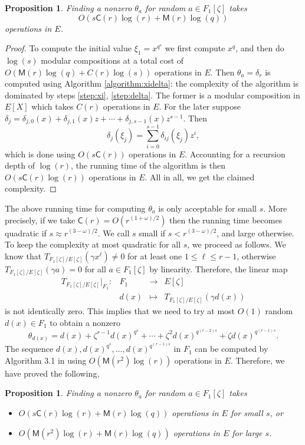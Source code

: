 \documentclass[12pt]{article}
\theoremstyle{plain}
\newtheorem{proposition}[theorem]{Proposition}
\theoremstyle{definition}
\def\MM{\ensuremath{\mathsf{M}}}
\def\CC{\ensuremath{\mathsf{C}}}
\newcounter{algorithm}
\begin{document}
\begin{proposition}
	\label{proposition:XiDelta}
	Finding a nonzero $\theta_a$ for random $a \in F_1[\zeta]$ takes \[O(s\CC(r)\log(r) + 
	\MM(r)\log(q))\] operations in $E$.
\end{proposition}
\begin{proof}
	To compute the initial value $\xi_1 = x^{q^s}$ we first compute $x^q$, and then do $\log(s)$ 
	modular compositions at a total cost of $O(\MM(r)\log(q) + C(r)\log(s))$ operations in $E$. 
	Then $\theta_a = \delta_r$ is computed using Algorithm \ref{algorithm:xidelta}: the complexity 
	of the algorithm is dominated by steps \ref{step:xi}, \ref{step:delta}. The former is a
	modular composition in $E[X]$ which takes $C(r)$ operations in $E$. For the later suppose 
	$\delta_j = \delta_{j,0}(x) + \delta_{j,1}(x)z + \cdots + \delta_{j,s - 1}(x)z^{s - 1}$. Then   
	\[ \delta_j(\xi_j) = \sum_{i = 0}^{s - 1}\delta_{ij}(\xi_j)z^i, \] which is done using 
	$O(s\CC(r))$ operations in $E$. Accounting for a recursion depth of $\log(r)$, the running 
	time of the algorithm is then $O(s\CC(r)\log(r))$ operations in $E$. All in all, we get the 
	claimed 
	complexity.
\end{proof}
The above running time for computing $\theta_a$ is only acceptable for small $s$. More precisely, 
if we take $\CC(r) = O(r^{(1 + \omega) / 2})$ then the running time becomes quadratic if $s \approx 
r^{(3 - \omega) / 2}$. We call $s$ small if $s < r^{(3 - \omega) / 2}$, and large otherwise. To 
keep the complexity at most quadratic for all $s$, we proceed as follows. We know that 
$T_{F_1[\zeta] / E[\zeta]}(\gamma x^\ell) \ne 0$ for at least one $1 \le \ell \le r - 1$, otherwise 
$T_{F_1[\zeta] / E[\zeta]}(\gamma a) = 0$ for all $a \in F_1[\zeta]$ by linearity. Therefore, the 
linear map 
\[
\begin{array}{rrll}
	T_{F_1[\zeta] / E[\zeta]}\vert_{F_1}: & F_1 & \longrightarrow & E[\zeta] \\
	& d(x) & \longmapsto & T_{F_1[\zeta] / E[\zeta]}(\gamma d(x))
\end{array}
\]
is not identically zero. This implies that we need to try at most $O(1)$ random $d(x) \in F_1$ to 
obtain a nonzero
\[ \theta_{d(x)} = d(x) + \zeta^{r - 1}d(x)^{q^s} + \cdots + \zeta^2d(x)^{q^{(r - 2)s}} + \zeta 
d(x)^{q^{(r - 1)s}}. \]
The sequence $d(x), d(x)^{q^s}, \dots, d(x)^{q^{(r - 1)s}}$ in $F_1$ can be computed by Algorithm 
3.1 in \cite{von1992computing} using $O(\MM(r^2)\log(r))$ operations in $E$. Therefore, we have 
proved the following,
\begin{proposition}
	\label{proposition:XiDelta-updated}
	Finding a nonzero $\theta_a$ for random $a \in F_1[\zeta]$ takes
	\begin{itemize}
		\item $O(s\CC(r)\log(r) + \MM(r)\log(q))$ operations in $E$ for small $s$, or
		\item $O(\MM(r^2)\log(r) + \MM(r)\log(q))$ operations in $E$ for large $s$.
	\end{itemize}
\end{proposition}
\end{document}
